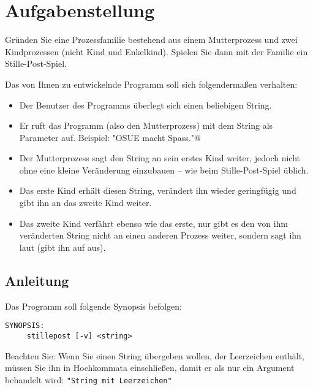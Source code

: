 




\section*{Aufgabenstellung}

Gründen Sie eine Prozessfamilie bestehend aus einem Mutterprozess und
zwei Kindprozessen (nicht Kind und Enkelkind). Spielen Sie dann mit
der Familie ein Stille-Post-Spiel.

Das von Ihnen zu entwickelnde Programm  soll sich
folgendermaßen verhalten:

\begin{itemize}
\item Der Benutzer des Programms überlegt sich einen beliebigen
String.
\item Er ruft das Programm (also den Mutterprozess) mit dem String als
Parameter auf. Beispiel:
\verb@stillepost "OSUE macht Spass."@
\item Der Mutterprozess sagt den String an sein erstes Kind weiter,
jedoch nicht ohne eine kleine Veränderung einzubauen – wie beim
Stille-Post-Spiel üblich.
\item Das erste Kind erhält diesen String, verändert ihn wieder
geringfügig und gibt ihn an das zweite Kind weiter.
\item Das zweite Kind verfährt ebenso wie das erste, nur gibt es den
von ihm veränderten String nicht an einen anderen Prozess weiter,
sondern sagt ihn laut (gibt ihn auf  aus).
\end{itemize}





\subsection*{Anleitung}

Das Programm soll folgende Synopsis befolgen:
\begin{verbatim}
SYNOPSIS:
     stillepost [-v] <string>
\end{verbatim}

Beachten Sie: Wenn Sie einen String übergeben wollen, der Leerzeichen
enthält, müssen Sie ihn in Hochkommata einschließen, damit er als
nur ein Argument behandelt wird: \verb_"String mit Leerzeichen"_

